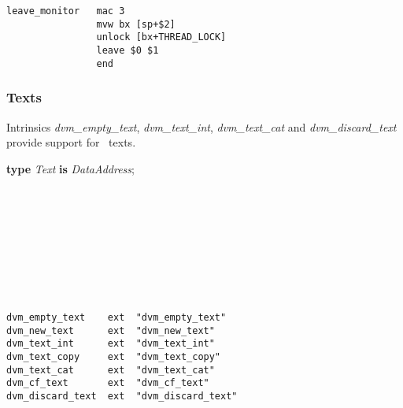 {\small
\begin{verbatim}
leave_monitor   mac 3
                mvw bx [sp+$2]
                unlock [bx+THREAD_LOCK]
                leave $0 $1
                end
\end{verbatim}}




\subsubsection{Texts}
Intrinsics \textit{dvm\_empty\_text}, \textit{dvm\_text\_int}, \textit{dvm\_text\_cat} and \textit{dvm\_discard\_text} provide support for \desi\  texts.

\begin{tabbing}
\indents
\vb\>\textbf{type} \emph{Text} \textbf{is} \emph{DataAddress};\\
\\[-10pt]
\\[-10pt]
\\[-10pt]
\\[-10pt]
\\[-10pt]
\\[-10pt]
\\[-10pt]
\\[-30pt]
\end{tabbing}

{\small
\begin{verbatim}
dvm_empty_text    ext  "dvm_empty_text"
dvm_new_text      ext  "dvm_new_text"
dvm_text_int      ext  "dvm_text_int"
dvm_text_copy     ext  "dvm_text_copy"
dvm_text_cat      ext  "dvm_text_cat"
dvm_cf_text       ext  "dvm_cf_text"
dvm_discard_text  ext  "dvm_discard_text"
\end{verbatim}}



